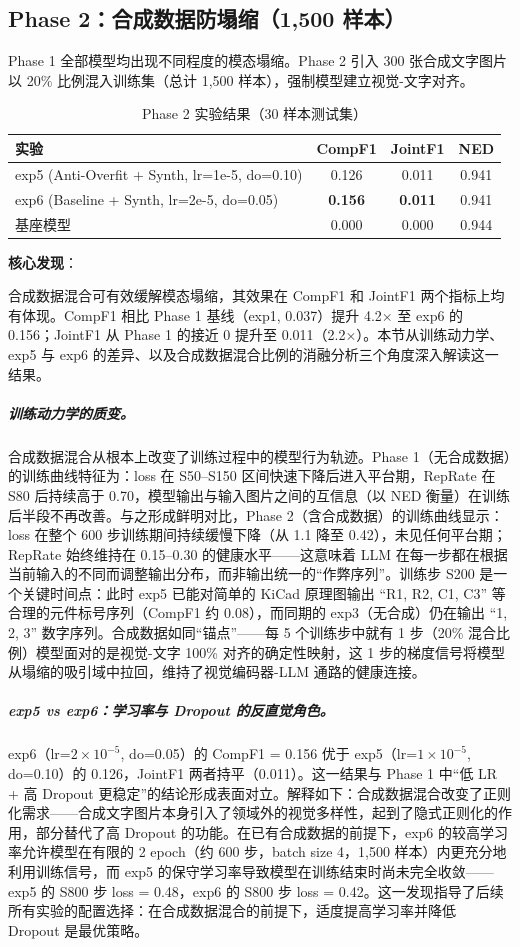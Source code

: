 \subsection{Phase 2：合成数据防塌缩（1,500 样本）}

Phase 1 全部模型均出现不同程度的模态塌缩。Phase 2 引入 300 张合成文字图片以 20\% 比例混入训练集（总计 1,500 样本），强制模型建立视觉-文字对齐。

\begin{table}[h]
\centering
\caption{Phase 2 实验结果（30 样本测试集）}
\begin{tabular}{lccc}
\toprule
\textbf{实验} & \textbf{CompF1} & \textbf{JointF1} & \textbf{NED} \\
\midrule
exp5 (Anti-Overfit + Synth, lr=1e-5, do=0.10) & 0.126 & 0.011 & 0.941 \\
exp6 (Baseline + Synth, lr=2e-5, do=0.05)     & \textbf{0.156} & \textbf{0.011} & 0.941 \\
\midrule
基座模型 & 0.000 & 0.000 & 0.944 \\
\bottomrule
\end{tabular}
\end{table}

\textbf{核心发现}：

合成数据混合可有效缓解模态塌缩，其效果在 CompF1 和 JointF1 两个指标上均有体现。CompF1 相比 Phase 1 基线（exp1, 0.037）提升 4.2$\times$ 至 exp6 的 0.156；JointF1 从 Phase 1 的接近 0 提升至 0.011（2.2$\times$）。本节从训练动力学、exp5 与 exp6 的差异、以及合成数据混合比例的消融分析三个角度深入解读这一结果。

\subparagraph{训练动力学的质变。}
合成数据混合从根本上改变了训练过程中的模型行为轨迹。Phase 1（无合成数据）的训练曲线特征为：loss 在 S50--S150 区间快速下降后进入平台期，RepRate 在 S80 后持续高于 0.70，模型输出与输入图片之间的互信息（以 NED 衡量）在训练后半段不再改善。与之形成鲜明对比，Phase 2（含合成数据）的训练曲线显示：loss 在整个 600 步训练期间持续缓慢下降（从 1.1 降至 0.42），未见任何平台期；RepRate 始终维持在 0.15--0.30 的健康水平——这意味着 LLM 在每一步都在根据当前输入的不同而调整输出分布，而非输出统一的``作弊序列''。训练步 S200 是一个关键时间点：此时 exp5 已能对简单的 KiCad 原理图输出 ``R1, R2, C1, C3'' 等合理的元件标号序列（CompF1 约 0.08），而同期的 exp3（无合成）仍在输出 ``1, 2, 3'' 数字序列。合成数据如同``锚点''——每 5 个训练步中就有 1 步（20\% 混合比例）模型面对的是视觉-文字 100\% 对齐的确定性映射，这 1 步的梯度信号将模型从塌缩的吸引域中拉回，维持了视觉编码器-LLM 通路的健康连接。

\subparagraph{exp5 vs exp6：学习率与 Dropout 的反直觉角色。}
exp6（lr=$2\times10^{-5}$, do=0.05）的 CompF1 = 0.156 优于 exp5（lr=$1\times10^{-5}$, do=0.10）的 0.126，JointF1 两者持平（0.011）。这一结果与 Phase 1 中``低 LR + 高 Dropout 更稳定''的结论形成表面对立。解释如下：合成数据混合改变了正则化需求——合成文字图片本身引入了领域外的视觉多样性，起到了隐式正则化的作用，部分替代了高 Dropout 的功能。在已有合成数据的前提下，exp6 的较高学习率允许模型在有限的 2 epoch（约 600 步，batch size 4，1,500 样本）内更充分地利用训练信号，而 exp5 的保守学习率导致模型在训练结束时尚未完全收敛——exp5 的 S800 步 loss = 0.48，exp6 的 S800 步 loss = 0.42。这一发现指导了后续所有实验的配置选择：在合成数据混合的前提下，适度提高学习率并降低 Dropout 是最优策略。


